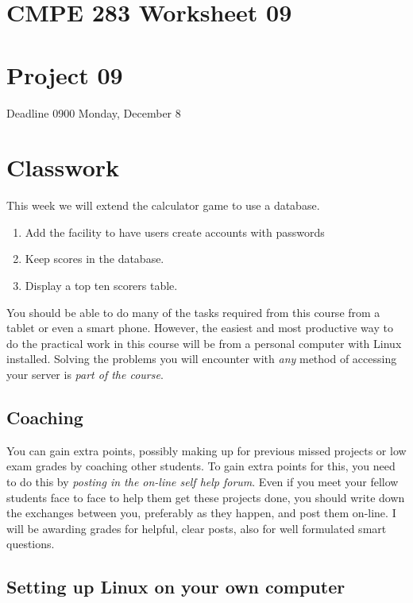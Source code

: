 \documentclass[12pt, a4paper]{article}
\begin{document}

\section*{CMPE 283 Worksheet 09}
\section*{Project 09} 
Deadline 0900 Monday, December 8


\section*{Classwork}

This week we will extend the calculator game to use a database.

\begin{enumerate}
 \item Add the facility to have users create accounts with passwords
 \item Keep scores in the database.
 \item Display a top ten scorers table.
\end{enumerate}

You should be able to do many of the tasks required from this course from a tablet or even a smart phone. However, the easiest and most productive way to do the practical work in this course will be from a personal computer with Linux installed. Solving the problems you will encounter with \emph{any} method of accessing your server is \emph{part of the course}.

\subsection*{Coaching}

You can gain extra points, possibly making up for previous missed projects or low exam grades by coaching other students. To gain extra points for this, you need to do this by \emph{posting in the on-line self help forum}. Even if you meet your fellow students face to face to help them get these projects done, you should write down the exchanges between you, preferably as they happen, and post them on-line. I will be awarding grades for helpful, clear posts, also for well formulated smart questions. 

\subsection*{Setting up Linux on your own computer}
\end{document}
